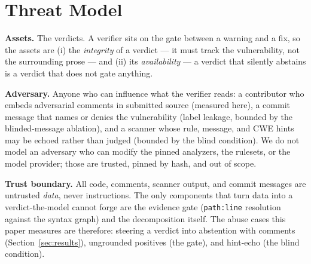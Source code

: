 \documentclass[conference]{IEEEtran}
\newcommand{\code}[1]{\texttt{#1}}
\begin{document}
\section{Threat Model}
\label{sec:threatmodel}
\textbf{Assets.} The verdicts. A verifier sits on the gate between a warning
and a fix, so the assets are (i) the \emph{integrity} of a verdict --- it must
track the vulnerability, not the surrounding prose --- and (ii) its
\emph{availability} --- a verdict that silently abstains is a verdict that does
not gate anything.

\textbf{Adversary.} Anyone who can influence what the verifier reads: a
contributor who embeds adversarial comments in submitted source (measured
here), a commit message that names or denies the vulnerability (label leakage,
bounded by the blinded-message ablation), and a scanner whose rule, message,
and CWE hints may be echoed rather than judged (bounded by the blind
condition). We do not model an adversary who can modify the pinned analyzers,
the rulesets, or the model provider; those are trusted, pinned by hash, and
out of scope.

\textbf{Trust boundary.} All code, comments, scanner output, and commit
messages are untrusted \emph{data}, never instructions. The only components
that turn data into a verdict-the-model cannot forge are the evidence gate
(\code{path:line} resolution against the syntax graph) and the decomposition
itself. The abuse cases this paper measures are therefore: steering a verdict
into abstention with comments (Section~\ref{sec:results}), ungrounded
positives (the gate), and hint-echo (the blind condition).
\end{document}
